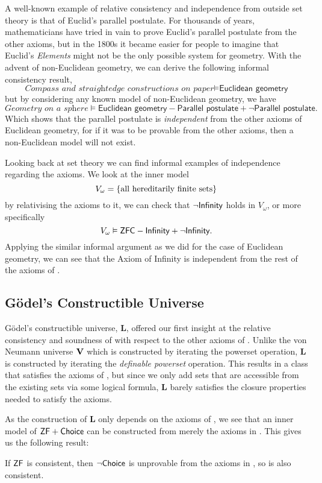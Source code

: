 A well-known example of relative consistency and independence from outside set theory is that of Euclid's parallel postulate.
For thousands of years, mathematicians have tried in vain to prove Euclid's parallel postulate from the other axioms,
but in the 1800s it became easier for people to imagine that Euclid's \emph{Elements} might not be the only possible system for geometry.
With the advent of non-Euclidean geometry, we can derive the following informal consistency result,
\[ \textit{Compass and straightedge constructions on paper} \models \textsf{Euclidean geometry} \]
but by considering any known model of non-Euclidean geometry, we have
\[ \textit{Geometry on a sphere} \models \textsf{Euclidean geometry} - \textsf{Parallel postulate} + \lnot\textsf{Parallel postulate}. \]
Which shows that the parallel postulate is \emph{independent} from the other axioms of Euclidean geometry,
for if it was to be provable from the other axioms, then a non-Euclidean model will not exist.

Looking back at set theory we can find informal examples of independence regarding the \ZFC axioms.
We look at the inner model \[V_\omega = {\left\{ \text{all hereditarily finite sets} \right\}}\]
by relativising the \ZFC axioms to it, we can check that
\(\lnot{\normalfont\textsf{Infinity}}\) holds in \(V_\omega\),
or more specifically
\[ V_\omega \vDash \mbox{\normalfont \textsf{ZFC}} - {\normalfont\textsf{Infinity}} + \lnot {\normalfont\textsf{Infinity}}. \]
Applying the similar informal argument as we did for the case of Euclidean geometry,
we can see that the Axiom of Infinity is independent from the rest of the axioms of \ZFC.


\subsection{Gödel's Constructible Universe}
\label{subsection:constructible}

Gödel's constructible universe, \(\mathbf{L}\), offered our first insight at the relative consistency and soundness of  with respect to the other axioms of \ZF.
Unlike the von Neumann universe \(\mathbf{V}\) which is constructed by iterating the powerset operation,
\(\mathbf{L}\) is constructed by iterating the \emph{definable powerset} operation.
This results in a class that satisfies the axioms of \ZFC, but since we only add sets that are accessible from the existing sets via some logical formula, \(\mathbf{L}\) barely satisfies the closure properties needed to satisfy the \ZFC axioms.

As the construction of \(\mathbf{L}\) only depends on the axioms of \ZF,
we see that an inner model of \(\mbox{\normalfont \textsf{ZF}} + {\normalfont\textsf{Choice}}\) can be constructed from merely the axioms in \ZF.
This gives us the following result:
\begin{theorem}
    If \(\mbox{\normalfont \textsf{ZF}}\) is consistent, then \(\lnot{\normalfont\textsf{Choice}}\) is unprovable from the axioms in \ZF, so \ZFC is also consistent.
\end{theorem}

